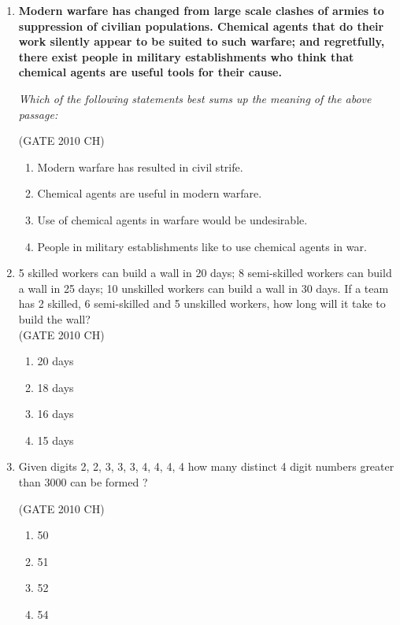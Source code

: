 \documentclass[journal,12pt,onecolumn]{exam}
\theoremstyle{remark}
\begin{document}
\begin{enumerate}
\item 
 \textbf{Modern warfare has changed from large scale clashes of armies to suppression of civilian populations. Chemical agents that do their work silently appear to be suited to such warfare; and regretfully, there exist people in military establishments who think that chemical agents are useful tools for their cause.}

\noindent\textit{Which of the following statements best sums up the meaning of the above passage:}

\hfill{(GATE 2010 CH)}\\

\begin{enumerate}
    \item Modern warfare has resulted in civil strife.
    \item Chemical agents are useful in modern warfare.
    \item Use of chemical agents in warfare would be undesirable.
    \item People in military establishments like to use chemical agents in war.
\end{enumerate}
\item 
 5 skilled workers can build a wall in 20 days; 8 semi-skilled workers can build a wall in 25 days; 10 unskilled workers can build a wall in 30 days. If a team has 2 skilled, 6 semi-skilled and 5 unskilled workers, how long will it take to build the wall?\\

\hfill{(GATE 2010 CH)}\\

\begin{enumerate}
    \item 20 days
    \item 18 days
    \item 16 days
    \item 15 days
\end{enumerate}
\item 
Given digits 2, 2, 3, 3, 3, 4, 4, 4, 4 how many distinct 4 digit numbers greater than 3000 can be formed ?

\hfill{(GATE 2010 CH)}\\

\begin{enumerate}
    \item 50
    \item 51
    \item 52
    \item 54
\end{enumerate}
 \end{enumerate}
\end{document}

